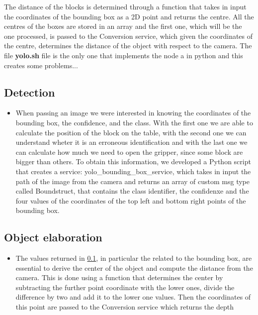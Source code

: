 \documentclass[12pt,a4paper]{article}
\begin{document}
\begin{itemize}
    The distance of the blocks is determined through a function that takes in input the coordinates of the bounding box as a 2D point and returns the centre. All the centres of the boxes are stored in an array and the first one, which will be the one processed, is passed to the Conversion service, which given the coordinates of the centre, determines the distance of the object with respect to the camera.
    The file \textbf{yolo.sh} file is the only one that implements the node a in python and this creates some problems...
\end{itemize}

\subsection{Detection}\label{subsec:detect}
\begin{itemize}
    \item When passing an image we were interested in knowing the coordinates of the bounding box, the confidence, and the class. With the first one we are able to calculate the position of the block on the table, with the second one we can understand wheter it is an erroneous identification and with the last one we can calculate how much we need to open the gripper, since some block are bigger than others. To obtain this information, we developed a Python script that creates a service: yolo\_bounding\_box\_service, which takes in input the path of the image from the camera and returns an array of custom msg type called Boundstruct, that contains the class identifier, the confidenxe and the four values of the coordinates of the top left and bottom right points of the bounding box.
\end{itemize}

\subsection{Object elaboration}\label{subsec:objel}
\begin{itemize}
    \item The values returned in \ref{subsec:detect}, in particular the related to the bounding box, are essential to derive the center of the object and compute the distance from the camera. This is done using a function that determines the center by subtracting the further point coordinate with the lower ones, divide the difference by two and add it to the lower one values. Then the coordinates of this point are passed to the Conversion service which returns the depth  
\end{itemize}
\end{document}
